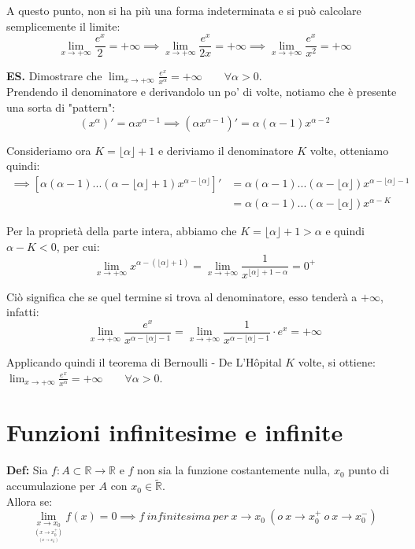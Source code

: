\documentclass{article}
\begin{document}
\noindent A questo punto, non si ha più una forma indeterminata e si può calcolare semplicemente il limite:
\begin{equation*}
    \lim_{x \to +\infty} \frac{e^x}{2} = +\infty \implies \lim_{x \to +\infty} \frac{e^x}{2x} = +\infty \implies \lim_{x \to +\infty} \frac{e^x}{x^2} = +\infty
\end{equation*}

\noindent\textbf{ES.} Dimostrare che $\lim_{x \to +\infty} \frac{e^x}{x^\alpha} = +\infty \qquad \forall \alpha > 0$.\\
Prendendo il denominatore e derivandolo un po' di volte, notiamo che è presente una sorta di "pattern":
\begin{equation*}
    (x^\alpha)' = \alpha x^{\alpha-1} \implies (\alpha x^{\alpha-1})' = \alpha(\alpha - 1) x^{\alpha-2} 
\end{equation*}

\noindent Consideriamo ora $K = \lfloor \alpha \rfloor + 1$ e deriviamo il denominatore $K$ volte, otteniamo quindi:
\begin{align*}
    \implies [\alpha(\alpha - 1)...(\alpha - \lfloor\alpha\rfloor + 1)x^{\alpha - \lfloor\alpha\rfloor}]' &= \alpha(\alpha - 1)...(\alpha - \lfloor\alpha\rfloor)x^{\alpha - \lfloor\alpha\rfloor - 1}\\
    &= \alpha(\alpha - 1)...(\alpha - \lfloor\alpha\rfloor)x^{\alpha - K}
\end{align*}

\noindent Per la proprietà della parte intera, abbiamo che $K = \lfloor \alpha\rfloor + 1 > \alpha$ e quindi $\alpha - K < 0$, per cui:
\begin{equation*}
    \lim_{x \to +\infty} x^{\alpha - (\lfloor\alpha\rfloor + 1)} = \lim_{x \to +\infty} \frac{1}{x^{\lfloor\alpha\rfloor + 1 - \alpha}} = 0^+
\end{equation*}

\noindent Ciò significa che se quel termine si trova al denominatore, esso tenderà a $+\infty$, infatti:
\begin{equation*}
    \lim_{x \to +\infty} \frac{e^x}{x^{\alpha - \lfloor\alpha\rfloor-1}} = \lim_{x \to +\infty} \frac{1}{x^{\alpha - \lfloor\alpha\rfloor-1}} \cdot e^x = +\infty
\end{equation*}

\noindent Applicando quindi il teorema di Bernoulli - De L'Hôpital $K$ volte, si ottiene: $\lim_{x \to +\infty} \frac{e^x}{x^\alpha} = +\infty \qquad \forall \alpha > 0$.

\section{Funzioni infinitesime e infinite}
\textbf{Def:} Sia $f: A \subset \mathbb{R} \xrightarrow{} \mathbb{R}$ e $f$ non sia la funzione costantemente nulla, $x_0$ punto di accumulazione per $A$ con $x_0 \in \widetilde{\mathbb{R}}$. \\
Allora se:
\begin{equation*}
    \lim_{\underset{\underset{\scriptstyle (x \to x_0^-)}{\scriptstyle (x \to x_0^+)}}{x \to x_0}} f(x) = 0 \implies f \ infinitesima \ per \ x \to x_0 \ (o \ x \to x_0^+ \ o \ x \to x_0^-)
\end{equation*}
\end{document}
